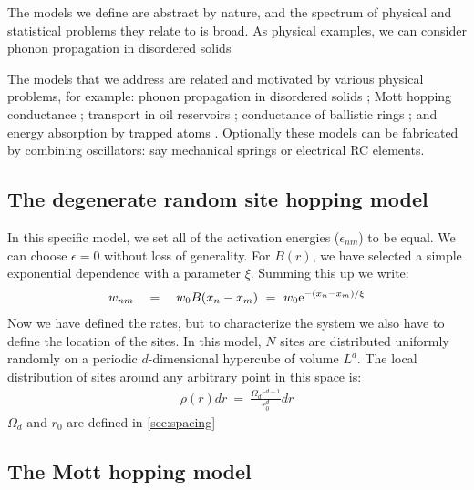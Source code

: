 The models we define are abstract by nature, and
the spectrum of physical and statistical problems they
relate to is broad. As physical examples, we can consider
phonon propagation in disordered solids 
\cite{nagel_normal-mod_1981,schirmacher_analogies_1992,amir_localization_2010,amir_mean_2008}


The models that we address are related and motivated  
by various physical problems, for example: 
phonon propagation in disordered solids \cite{phn1,phn2,amir}; 
Mott hopping conductance \cite{mott,miller,AHL,Halp,pollak,VRHbook};
transport in oil reservoirs \cite{aa1,aa2};
conductance of ballistic rings \cite{kbd};
and energy absorption by trapped atoms \cite{kbw}. 
%
Optionally these models can be fabricated by combining oscillators: 
say mechanical springs or electrical RC elements. 


\subsection{The degenerate random site hopping model} \label{sec:degenerate_random_hopping}

In this specific model, we set all of the activation energies ($\epsilon_{nm}$)
to be equal. We can choose $\epsilon=0$ without loss of generality. For $B(r)$, 
we have selected a simple exponential dependence with a parameter $\xi$.
Summing this up we write:
%
\begin{align}\label{eq:random_hopping_rates}
w_{nm} \quad = \quad w_0 B(x_n-x_m) \ = \ w_0 \mbox{e}^{-(x_n-x_m)/\xi}
\end{align}
%
Now we have defined the rates, but to characterize the system we also
have to define the location of the sites. In this model, $N$ sites are distributed
uniformly randomly on a periodic $d$-dimensional hypercube of volume $L^d$. The
local distribution of sites around any arbitrary point in this space is:
%
\begin{align}\label{eq:site_distribution}
\rho(r)dr \ =\ \frac{\Omega_d r^{d-1}}{r_0^d} dr
\end{align}
%
$\Omega_d$ and $r_0$ are defined in \autoref{sec:spacing}

\subsection{The Mott hopping model}\label{sec:mott_hopping}

